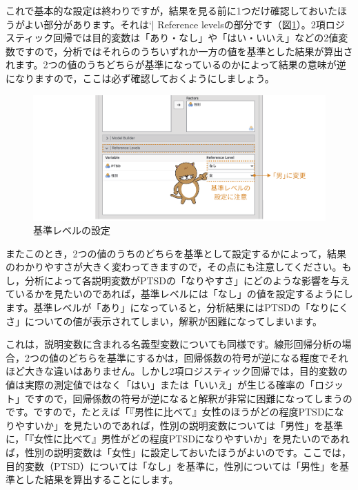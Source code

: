 \documentclass[
  12pt,
  a5jpaper,
  lualatex, ja=standard]{bxjsbook}
\begin{document}
これで基本的な設定は終わりですが，結果を見る前に1つだけ確認しておいたほうがよい部分があります。それは`\colorbox{bar}{\textcolor{gmoji2}{| Reference levels}}の部分です（図\ref{fig:regression-binomial-reference-levels}）。2項ロジスティック回帰では目的変数は「あり・なし」や「はい・いいえ」などの2値変数ですので，分析ではそれらのうちいずれか一方の値を基準とした結果が算出されます。2つの値のうちどちらが基準になっているのかによって結果の意味が逆になりますので，ここは必ず確認しておくようにしましょう。

\begin{figure}[!ht]

{\centering \includegraphics[width=1\linewidth]{images/regression/binomial-reference-levels} 

}

\caption{基準レベルの設定}\label{fig:regression-binomial-reference-levels}
\end{figure}

またこのとき，2つの値のうちのどちらを基準として設定するかによって，結果のわかりやすさが大きく変わってきますので，その点にも注意してください。もし，分析によって各説明変数がPTSDの「なりやすさ」にどのような影響を与えているかを見たいのであれば，基準レベルには「なし」の値を設定するようにします。基準レベルが「あり」になっていると，分析結果にはPTSDの「なりにくさ」についての値が表示されてしまい，解釈が困難になってしまいます。

これは，説明変数に含まれる名義型変数についても同様です。線形回帰分析の場合，2つの値のどちらを基準にするかは，回帰係数の符号が逆になる程度でそれほど大きな違いはありません。しかし2項ロジスティック回帰では，目的変数の値は実際の測定値ではなく「はい」または「いいえ」が生じる確率の「ロジット」ですので，回帰係数の符号が逆になると解釈が非常に困難になってしまうのです。ですので，たとえば「『男性に比べて』女性のほうがどの程度PTSDになりやすいか」を見たいのであれば，性別の説明変数については「男性」を基準に，「『女性に比べて』男性がどの程度PTSDになりやすいか」を見たいのであれば，性別の説明変数は「女性」に設定しておいたほうがよいのです。ここでは，目的変数（PTSD）については「なし」を基準に，性別については「男性」を基準とした結果を算出することにします。
\end{document}
